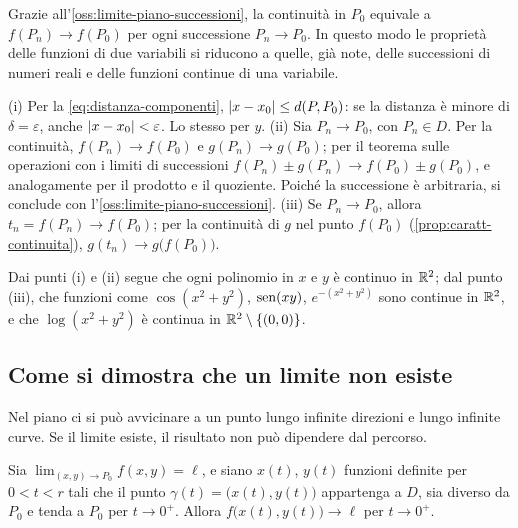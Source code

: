 \begin{schema}
\end{schema}

\begin{strategia}
Grazie all'\cref{oss:limite-piano-successioni}, la continuità in $P_{0}$ equivale a
$f(P_{n})\to f(P_{0})$ per ogni successione $P_{n}\to P_{0}$. In questo modo le
proprietà delle funzioni di due variabili si riducono a quelle, già note, delle
successioni di numeri reali e delle funzioni continue di una variabile.
\end{strategia}

\begin{dimostrazione}
(i) Per la \eqref{eq:distanza-componenti}, $\lvert x-x_{0}\rvert\le d(P,P_{0})$: se la distanza è
minore di $\delta=\varepsilon$, anche $\lvert x-x_{0}\rvert<\varepsilon$. Lo stesso per $y$.
(ii) Sia $P_{n}\to P_{0}$, con $P_{n}\in D$. Per la continuità, $f(P_{n})\to f(P_{0})$ e
$g(P_{n})\to g(P_{0})$; per il teorema sulle operazioni con i limiti di successioni
$f(P_{n})\pm g(P_{n})\to f(P_{0})\pm g(P_{0})$, e analogamente per il prodotto e il
quoziente. Poiché la successione è arbitraria, si conclude con
l'\cref{oss:limite-piano-successioni}.
(iii) Se $P_{n}\to P_{0}$, allora $t_{n}=f(P_{n})\to f(P_{0})$; per la continuità di $g$
nel punto $f(P_{0})$ (\cref{prop:caratt-continuita}), $g(t_{n})\to g\bigl(f(P_{0})\bigr)$.
\end{dimostrazione}

Dai punti (i) e (ii) segue che ogni polinomio in $x$ e $y$ è continuo in $\mathbb{R}^{2}$; dal
punto (iii), che funzioni come $\cos(x^{2}+y^{2})$, $\operatorname{sen}(xy)$, $e^{-(x^{2}+y^{2})}$ sono
continue in $\mathbb{R}^{2}$, e che $\log(x^{2}+y^{2})$ è continua in $\mathbb{R}^{2}\setminus\{(0,0)\}$.

\subsection{Come si dimostra che un limite non esiste}

Nel piano ci si può avvicinare a un punto lungo infinite direzioni e lungo infinite
curve. Se il limite esiste, il risultato non può dipendere dal percorso.

\begin{proposizione}\label{prop:restrizione-curva}
Sia $\lim_{(x,y)\to P_{0}}f(x,y)=\ell$, e siano $x(t)$, $y(t)$ funzioni definite per
$0<t<r$ tali che il punto $\gamma(t)=\bigl(x(t),y(t)\bigr)$ appartenga a $D$, sia diverso
da $P_{0}$ e tenda a $P_{0}$ per $t\to0^{+}$. Allora $f\bigl(x(t),y(t)\bigr)\to\ell$ per
$t\to0^{+}$.
\end{proposizione}

